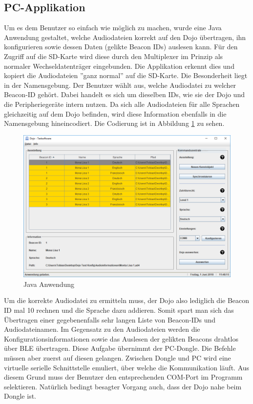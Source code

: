 \subsection{PC-Applikation}
Um es dem Benutzer so einfach wie möglich zu machen, wurde eine Java Anwendung gestaltet, welche Audiodateien korrekt auf den Dojo übertragen, ihn konfigurieren sowie dessen Daten (gelikte Beacon IDs) auslesen kann.
Für den Zugriff auf die SD-Karte wird diese durch den Multiplexer im Prinzip als normaler Wechseldatenträger eingebunden. Die Applikation erkennt dies und kopiert die Audiodateien ''ganz normal'' auf die SD-Karte. Die Besonderheit liegt in der Namensgebung. Der Benutzer wählt aus, welche Audiodatei zu welcher Beacon-ID gehört. Dabei handelt es sich um dieselben IDs, wie sie der Dojo und die Peripheriegeräte intern nutzen. Da sich alle Audiodateien für alle Sprachen gleichzeitig auf dem Dojo befinden, wird diese Information ebenfalls in die Namensgebung hineincodiert. Die Codierung ist in Abbildung \ref{fig:soft_5} zu sehen.
\begin{figure}[h]
	\centering
	\includegraphics[width=\textwidth]{graphics/Java_Anwendung.png}
	\caption{Java Anwendung}
	\label{fig:soft_5}
\end{figure}
Um die korrekte Audiodatei zu ermitteln muss, der Dojo also lediglich die Beacon ID mal 10 rechnen und die Sprache dazu addieren. Somit spart man sich das Übertragen einer gegebenenfalls sehr langen Liste von Beacon-IDs und Audiodateinamen.
Im Gegensatz zu den Audiodateien werden die Konfigurationsinformationen sowie das Auslesen der gelikten Beacons drahtlos über BLE übertragen. Diese Aufgabe übernimmt der PC-Dongle. Die Befehle müssen aber zuerst auf diesen gelangen. Zwischen Dongle und PC wird eine virtuelle serielle Schnittstelle emuliert, über welche die Kommunikation läuft. Aus diesem Grund muss der Benutzer den entsprechenden COM-Port im Programm selektieren. Natürlich bedingt besagter Vorgang auch, dass der Dojo nahe beim Dongle ist. \newpage

